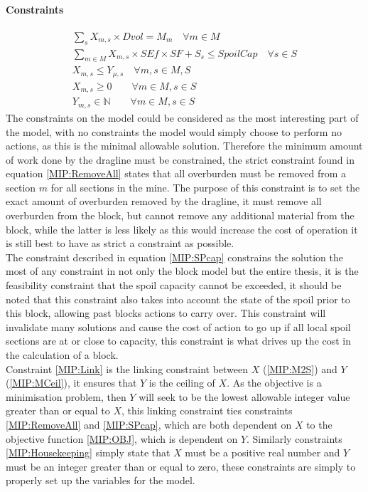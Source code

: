 \paragraph*{Constraints}
\begin{align}
\label{MIP:RemoveAll}
\sum_{s}X_{m,s}\times Dvol = M_{m}  \quad \forall m\in M  \\
\label{MIP:SPcap}
\sum_{m\in M} X_{m,s}\times SEf \times SF + S_s\leq SpoilCap \quad \forall s \in S \\ 
\label{MIP:Link}
X_{m,s} \leq Y_{\mu,s} \quad \forall m,s \in M,S\\
\label{MIP:Housekeeping}
X_{m,s} \geq 0 \qquad \forall m \in M , s \in S\\
Y_{m,s} \in \mathbb{N} \qquad \forall m \in M , s \in S
\end{align}
The constraints on the model could be considered as the most interesting part of the model, with no constraints the model would simply choose to perform no actions, as this is the minimal allowable solution. Therefore the minimum amount of work done by the dragline must be constrained, the strict constraint found in  equation \ref{MIP:RemoveAll} states that all overburden must be removed from a section $m$ for all sections in the mine. The purpose of this constraint is to set the exact amount of overburden removed by the dragline, it must remove all overburden from the block, but cannot remove any additional material from the block, while the latter is less likely as this would increase the cost of operation it is still best to have as strict a constraint as possible. \\
The constraint described in equation \ref{MIP:SPcap} constrains the solution the most of any constraint in not only the block model but the entire thesis, it is the feasibility constraint that the spoil capacity cannot be exceeded, it should be noted that this constraint also takes into account the state of the spoil prior to this block, allowing past blocks actions to carry over. This constraint will invalidate many solutions and cause the cost of action to go up if all local spoil sections are at or close to capacity, this constraint is what drives up the cost in the calculation of a block. 
\\ Constraint \ref{MIP:Link} is the linking constraint between $X$ (\ref{MIP:M2S}) and $Y$ (\ref{MIP:MCeil}), it ensures that $Y$ is the ceiling of $X$. As the objective is a minimisation problem, then $Y$ will seek to be the lowest allowable integer value greater than or equal to $X$, this linking constraint ties constraints \ref{MIP:RemoveAll} and \ref{MIP:SPcap}, which are both dependent on $X$ to the objective function \ref{MIP:OBJ}, which is dependent on $Y$. Similarly constraints \ref{MIP:Housekeeping} simply state that $X$ must be a positive real number and $Y$ must be an integer greater than or equal to zero, these constraints are simply to properly set up the variables for the model. 
